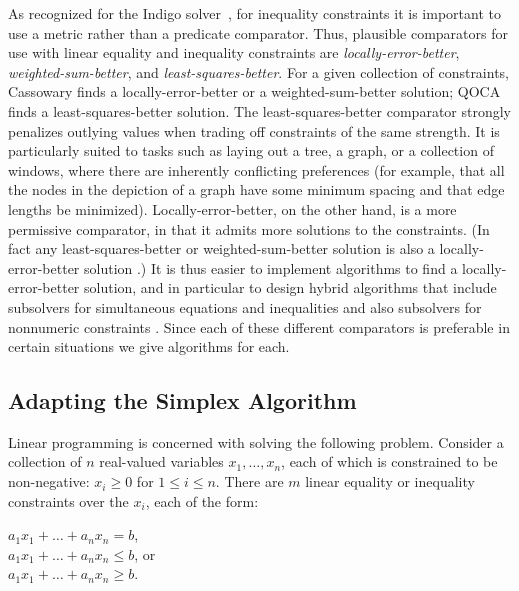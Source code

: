 \documentclass{article}
\begin{document}
As recognized for the Indigo solver~\cite{borning-uist-96},
for inequality constraints it is important to use a metric rather than a
predicate comparator.  Thus, plausible comparators for use with linear
equality and inequality constraints are {\em locally-error-better}, 
{\em weighted-sum-better}, and {\em least-squares-better}.  
For a given
collection of constraints, Cassowary finds a locally-error-better or a
weighted-sum-better solution; QOCA finds a least-squares-better solution.
The least-squares-better comparator strongly
penalizes outlying values when trading off constraints of the same
strength.  It is particularly suited to tasks such as laying out a tree, a
graph, or a collection of windows, where there are inherently conflicting
preferences (for example, that all the nodes in the depiction of a graph
have some minimum spacing and that edge lengths be minimized).
Locally-error-better, on the other hand, is a more permissive
comparator, in that it admits more solutions to the constraints.  (In fact
any least-squares-better or weighted-sum-better solution is also a
locally-error-better solution \cite{borning-lisp-symbolic-computation-92}.)
It is thus easier to implement algorithms to find a locally-error-better
solution, and in particular to design hybrid algorithms that include
subsolvers for simultaneous equations and inequalities and also subsolvers
for nonnumeric constraints \cite{borning-cp-95}.
Since each of these different comparators is preferable in certain
situations we  give algorithms for each.

\subsection{Adapting the Simplex Algorithm}

Linear programming is concerned with solving the following problem.  Consider
a collection of $n$ real-valued variables $x_1, \ldots, x_n$, each
of which  is constrained to be non-negative: 
$x_i \geq 0$ for $1 \leq i \leq n$.  There are  $m$
linear equality or inequality constraints over the $x_i$, each of the form:

\hspace*{5mm}\mbox{$a_1 x_1 + \ldots + a_n x_n = b$},\\
\hspace*{5mm}\mbox{$a_1 x_1 + \ldots + a_n x_n \leq b$},  or\\
\hspace*{5mm}\mbox{$a_1 x_1 + \ldots + a_n x_n \geq b$}.
\end{document}
